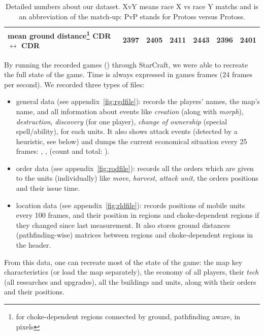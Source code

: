 \begin{table}[h]
\begin{tabular}{|l|c|c|c|c|c|c|}
mean ground distance\footnote{for choke-dependent regions connected by ground, pathfinding aware, in pixels} CDR $\leftrightarrow$ CDR & 2397 & 2405 & 2411 & 2443 & 2396 & 2401 \\ %
\hline
\end{tabular}
\caption{Detailed numbers about our dataset. XvY means race X vs race Y matchs and is an abbreviation of the match-up: PvP stands for Protoss versus Protoss.}
\label{tab:dataset}
\end{table}

By running the recorded games () through StarCraft, we were able to recreate the full state of the game. Time is always expressed in games frames (24 frames per second). We recorded three types of files:
\begin{itemize}
    \item general data (see appendix~\ref{fig:rgdfile}): records the players' names, the map's name, and all information about events like \textit{creation} (along with \textit{morph}), \textit{destruction}, \textit{discovery} (for one player), \textit{change of ownership} (special spell/ability), for each units. It also shows attack events (detected by a heuristic, see below) and dumps the current economical situation every 25 frames: , ,  (count and total: ).
    \item order data (see appendix~\ref{fig:rodfile}): records all the orders which are given to the units (individually) like \textit{move}, \textit{harvest}, \textit{attack unit}, the orders positions and their issue time.
    \item location data (see appendix~\ref{fig:rldfile}): records positions of mobile units every 100 frames, and their position in regions and choke-dependent regions if they changed since last measurement. It also stores ground distances (pathfinding-wise) matrices between regions and choke-dependent regions in the header.
\end{itemize}
From this data, one can recreate most of the state of the game: the map key characteristics (or load the map separately), the economy of all players, their \textit{tech} (all researches and upgrades), all the buildings and units, along with their orders and their positions.

